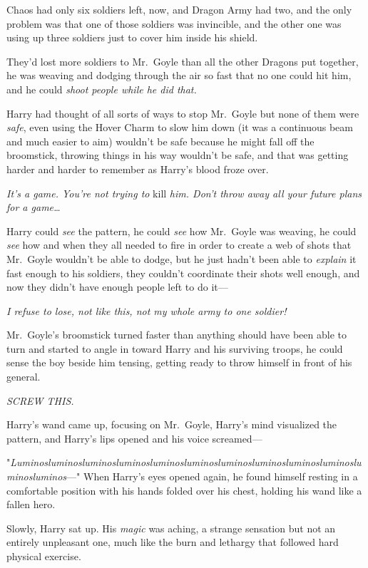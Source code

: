 Chaos had only six soldiers left, now, and Dragon Army had two, and the only
problem was that one of those soldiers was invincible, and the other one was
using up three soldiers just to cover him inside his shield.

They'd lost more soldiers to Mr.~Goyle than all the other Dragons put together,
he was weaving and dodging through the air so fast that no one could hit him,
and he could \emph{shoot people while he did that.}

Harry had thought of all sorts of ways to stop Mr.~Goyle but none of them were
\emph{safe}, even using the Hover Charm to slow him down (it was a continuous
beam and much easier to aim) wouldn't be safe because he might fall off the
broomstick, throwing things in his way wouldn't be safe, and that was getting
harder and harder to remember as Harry's blood froze over.

\emph{It's a game. You're not trying to} kill \emph{him. Don't throw away all
your future plans for a game{\ldots}}

Harry could \emph{see} the pattern, he could \emph{see} how Mr.~Goyle was
weaving, he could \emph{see} how and when they all needed to fire in order to
create a web of shots that Mr.~Goyle wouldn't be able to dodge, but he just
hadn't been able to \emph{explain} it fast enough to his soldiers, they
couldn't coordinate their shots well enough, and now they didn't have enough
people left to do it---

\emph{I refuse to lose, not like this, not my whole army to one soldier!}

Mr.~Goyle's broomstick turned faster than anything should have been able to
turn and started to angle in toward Harry and his surviving troops, he could
sense the boy beside him tensing, getting ready to throw himself in front of
his general.

\emph{SCREW THIS.}

Harry's wand came up, focusing on Mr.~Goyle, Harry's mind visualized the
pattern, and Harry's lips opened and his voice screamed---

"\emph{Lu\-min\-os\-lu\-min\-os\-lu\-min\-os\-lu\-min\-os\-lu\-min\-os\-lu\-min\-os\-lu\-min\-os\-lu\-min\-os\-lu\-min\-os\-lu\-min\-os\-lu\-min\-os\-lu\-min\-os}---"
\sbreak
When Harry's eyes opened again, he found himself resting in a comfortable
position with his hands folded over his chest, holding his wand like a fallen
hero.

Slowly, Harry sat up. His \emph{magic} was aching, a strange sensation but not
an entirely unpleasant one, much like the burn and lethargy that followed hard
physical exercise.


